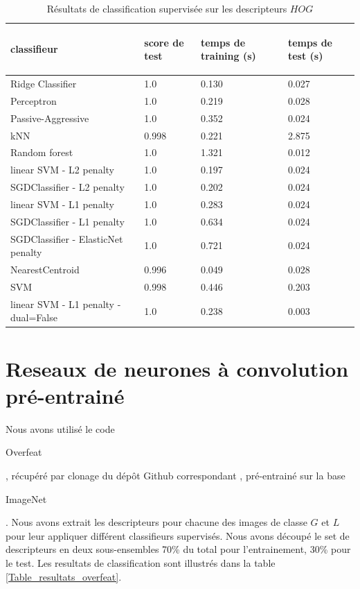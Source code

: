 \documentclass{book}
\begin{document}
\begin{table}
\begin{center}
\begin{tabular}{|p{5cm}|p{2cm}|p{2cm}|p{2cm}|}
\hline
\begin{bf}classifieur\end{bf}& \begin{bf}score de test\end{bf} & \begin{bf}temps de training (s)\end{bf} & \begin{bf}temps de test (s)\end{bf} \\
\hline
Ridge Classifier & 1.0 & 0.130 & 0.027\\
\hline
Perceptron & 1.0 & 0.219 & 0.028\\
\hline
Passive-Aggressive & 1.0 & 0.352 & 0.024\\
\hline
kNN & 0.998 & 0.221 & 2.875\\
\hline
Random forest & 1.0 & 1.321 & 0.012\\
\hline
linear SVM - L2 penalty & 1.0 & 0.197 & 0.024\\
\hline
SGDClassifier - L2 penalty & 1.0 & 0.202 & 0.024\\
\hline
linear SVM - L1 penalty & 1.0 & 0.283 & 0.024\\
\hline
SGDClassifier - L1 penalty & 1.0 & 0.634 & 0.024\\
\hline
SGDClassifier - ElasticNet penalty & 1.0 & 0.721 & 0.024\\
\hline
NearestCentroid & 0.996 & 0.049 & 0.028\\
\hline
SVM & 0.998 & 0.446 & 0.203\\
\hline
linear SVM - L1 penalty - dual=False & 1.0 & 0.238 & 0.003\\
\hline
\end{tabular}
\end{center}
\caption{Résultats de classification supervisée sur les descripteurs $HOG$}
\label{Table_resultats_hog}
\end{table}

\section{Reseaux de neurones à convolution pré-entrainé}
Nous avons utilisé le code \begin{itshape}Overfeat\end{itshape} \cite{DBLP:journals/corr/SermanetEZMFL13}, récupéré par clonage du dépôt 
Github correspondant \cite{overfeat}, pré-entrainé sur la base \begin{itshape}ImageNet\end{itshape} \cite{imagenet_cvpr09}.
Nous avons extrait les descripteurs pour chacune des images de classe $G$ et $L$ pour leur appliquer différent classifieurs
 supervisés. Nous avons découpé le set de descripteurs en deux sous-ensembles 70\% du total pour l'entrainement, 30\% pour le test.
 Les resultats de classification sont illustrés dans la table \ref{Table_resultats_overfeat}.
 
\end{document}
